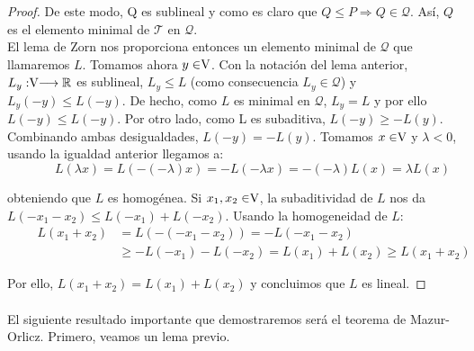 \begin{proof}
		De este modo, Q es sublineal y como es claro que $ Q \leq P \Longrightarrow Q \in \mathcal{Q}$. Así, $ Q $ es el elemento minimal de $ \mathcal{T} $ en $\mathcal{Q}$.\\
		
		El lema de Zorn nos proporciona entonces un elemento minimal de $ \mathcal{Q} $ que llamaremos $ L $. Tomamos ahora $ y \in \vecSpace $. Con la notación del lema anterior, $ L_y : \vecSpace \longrightarrow \RR $ es sublineal, $ L_y \leq L $ (como consecuencia $ L_y \in \mathcal{Q} $) y $ L_y (-y) \leq L(-y) $. De hecho, como $ L $ es minimal en $ \mathcal{Q} $, $ L_y = L $ y por ello $ L (-y) \leq L(-y) $. Por otro lado, como L es subaditiva, $ L(-y) \geq -L(y) $. Combinando ambas desigualdades, $ L(-y) = -L(y) $. Tomamos $ x \in \vecSpace $ y $ \lambda < 0 $, usando la igualdad anterior llegamos a:
		\[ \qquad \quad
		L(\lambda x) = L (-(-\lambda)x) = -L(-\lambda x) = -(-\lambda)L(x) = \lambda L(x) \label{1}
		\] 
		
		obteniendo que $ L $ es homogénea. Si $ x_1, x_2 \in \vecSpace $, la subaditividad de $ L $ nos da $ L(-x_1-x_2) \leq L(-x_1) + L(-x_2) $. Usando la homogeneidad de $ L $:
		\begin{equation*}
		\begin{split} \qquad
		L(x_1+x_2) &= L(-(-x_1-x_2)) = -L(-x_1-x_2) \\ 
		& \geq -L(-x_1)-L(-x_2) = L(x_1) + L (x_2) \geq L(x_1+x_2) 
		\end{split}
		\end{equation*}
		
		Por ello, $	L(x_1+x_2) = L(x_1) + L (x_2) $ y concluimos que $ L $ es lineal.
		
	\end{proof}

	\paragraph{} El siguiente resultado importante que demostraremos será el teorema de Mazur-Orlicz. Primero, veamos un lema previo.
	
